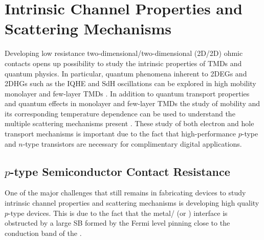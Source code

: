 \chapter{Intrinsic Channel Properties and Scattering Mechanisms}\label{chap:results}
Developing low resistance two-dimensional/two-dimensional (2D/2D) ohmic contacts opens up possibility to study the intrinsic properties of \acp{TMD} and quantum physics. In particular, quantum phenomena inherent to \acp{2DEG} and \acp{2DHG} such as the \ac{IQHE} and \ac{SdH} oscillations can be explored in high mobility monolayer and few-layer \acp{TMD} \cite{Cui_NatureNano2015}. In addition to quantum transport properties and quantum effects in monolayer and few-layer \acp{TMD} the study of mobility and its corresponding temperature dependence can be used to understand the multiple scattering mechanisms present \cite{Kaasbjerg_PhysRevB2012}. These study of both electron and hole transport mechanisms is important due to the fact that high-performance $p$-type and $n$-type transistors are necessary for complimentary digital applications. 

\section{$p$-type  Semiconductor Contact Resistance}\label{sec:pWSe2_contacts}
One of the major challenges that still remains in fabricating devices to study intrinsic channel properties and scattering mechanisms is developing high quality $p$-type  devices. This is due to the fact that the metal/ (or ) interface is obstructed by a large \ac{SB} formed by the Fermi level pinning close to the conduction band of the  \cite{Chuang_NanoLett2014,Das_NanoLett2012}. \\ \\

